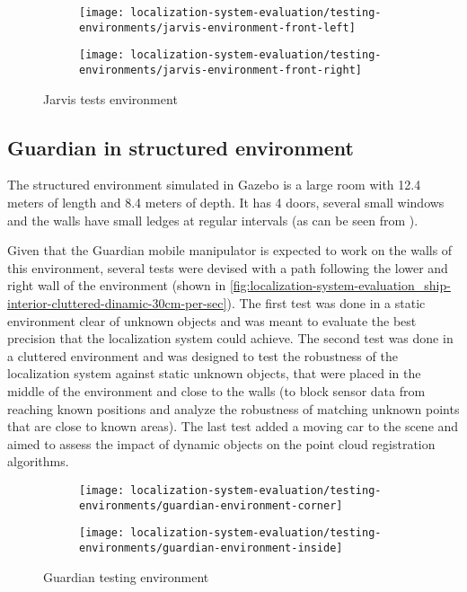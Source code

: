 \begin{figure}
	\centering
	\begin{subfigure}[h]{.497\textwidth}
		\centering
		\texttt{[image: localization-system-evaluation/testing-environments/jarvis-environment-front-left]}
	\end{subfigure}
	\begin{subfigure}[h]{.497\textwidth}
		\centering
		\texttt{[image: localization-system-evaluation/testing-environments/jarvis-environment-front-right]}
	\end{subfigure}
	\caption{Jarvis tests environment}
	\label{fig:localization-system-evaluation_jarvis-tests-environment}
\end{figure}


\subsection{Guardian in structured environment}

The structured environment simulated in Gazebo is a large room with 12.4 meters of length and 8.4 meters of depth. It has 4 doors, several small windows and the walls have small ledges at regular intervals (as can be seen from ).

Given that the Guardian mobile manipulator is expected to work on the walls of this environment, several tests were devised with a path following the lower and right wall of the environment (shown in \cref{fig:localization-system-evaluation_ship-interior-cluttered-dinamic-30cm-per-sec}). The first test was done in a static environment clear of unknown objects and was meant to evaluate the best precision that the localization system could achieve. The second test was done in a cluttered environment and was designed to test the robustness of the localization system against static unknown objects, that were placed in the middle of the environment and close to the walls (to block sensor data from reaching known positions and analyze the robustness of matching unknown points that are close to known areas). The last test added a moving car to the scene and aimed to assess the impact of dynamic objects on the point cloud registration algorithms.


\begin{figure}[H]
	\centering
	\begin{subfigure}[h]{.497\textwidth}
		\centering
		\texttt{[image: localization-system-evaluation/testing-environments/guardian-environment-corner]}
	\end{subfigure}
	\begin{subfigure}[h]{.497\textwidth}
		\centering
		\texttt{[image: localization-system-evaluation/testing-environments/guardian-environment-inside]}
	\end{subfigure}
	\caption{Guardian testing environment}
	\label{fig:localization-system-evaluation_guardian-tests-environment}
\end{figure}

